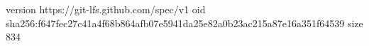 version https://git-lfs.github.com/spec/v1
oid sha256:f647fec27c41a4f68b864afb07e5941da25e82a0b23ac215a87e16a351f64539
size 834
